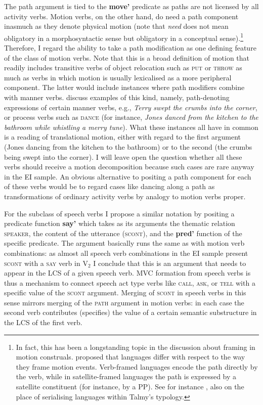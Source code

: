 The path argument is tied to the \textbf{move'} predicate as paths are not licensed by all activity verbs. Motion verbs, on the other hand, do need a path component inasmuch as they denote physical motion (note that \emph{need} does not mean obligatory in a morphosyntactic sense but obligatory in a conceptual sense).\footnote{In fact, this has been a longstanding topic in the discussion about framing in motion construals. \citet{talmy1985lexicalization, talmy2000toward} proposed that languages differ with respect to the way they frame motion events. Verb-framed languages encode the path directly by the verb, while in satellite-framed languages the path is expressed by a satellite constituent (for instance, by a PP). See for instance \citet{bohnemeyer2007principles}, also \citet{Ameka2013} on the place of serialising languages within Talmy's typology.} Therefore, I regard the ability to take a path modification as one defining feature of the class of motion verbs. Note that this is a broad definition of motion that readily includes transitive verbs of object relocation such as \textsc{put} or \textsc{throw} as much as verbs in which motion is usually lexicalised as a more peripheral component. The latter would include instances where path modifiers combine with manner verbs. \citet{rappaport1998building} discuss examples of this kind, namely, path-denoting expressions of certain manner verbs, e.g., \textit{Terry swept the crumbs into the corner}, or process verbs such as \textsc{dance} (for instance, \textit{Jones danced from the kitchen to the bathroom while whistling a merry tune}). What these instances all have in common is a reading of translational motion, either with regard to the first argument (Jones dancing from the kitchen to the bathroom) or to the second (the crumbs being swept into the corner). I will leave open the question whether all these verbs should receive a motion decomposition because such cases are rare anyway in the EI sample. An obvious alternative to positing a path component for each of these verbs would be to regard cases like dancing along a path as transformations of ordinary activity verbs by analogy to motion verbs proper.

For the subclass of speech verbs I propose a similar notation by positing a predicate function \textbf{say'} which takes as its arguments the thematic relation \textsc{speaker}, the content of the utterance (\textsc{scont}), and the \textbf{pred'} function of the specific predicate. The argument basically runs the same as with motion verb combinations: as almost all speech verb combinations in the EI sample present \textsc{scont} with a \textsc{say} verb in V$_2$ I conclude that this is an argument that needs to appear in the LCS of a given speech verb. MVC formation from speech verbs is thus a mechanism to connect speech act type verbs like \textsc{call}, \textsc{ask}, or \textsc{tell} with a specific value of the \textsc{scont} argument. Merging of \textsc{scont} in speech verbs in this sense mirrors merging of the \textsc{path} argument in motion verbs: in each case the second verb contributes (specifies) the value of a certain semantic substructure in the LCS of the first verb.

